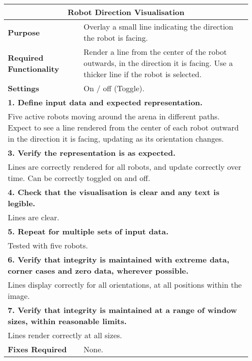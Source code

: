 \begin{longtable}{ l p{10cm} }
 \hline
 \multicolumn{2}{c}{\textbf{Robot Direction Visualisation}}\\
 \hline
 \textbf{Purpose} & Overlay a small line indicating the direction the robot is facing.\\
 \textbf{Required Functionality} & Render a line from the center of the robot outwards, in the direction it is facing. Use a thicker line if the robot is selected.\\
 \textbf{Settings} & On / off (Toggle).\\
 \hline
 \multicolumn{2}{p{14cm}}{\textbf{1. Define input data and expected representation.}}\\
 \multicolumn{2}{p{14cm}}{Five active robots moving around the arena in different paths. Expect to see a line rendered from the center of each robot outward in the direction it is facing, updating as its orientation changes.}\\
 \hline
 \multicolumn{2}{p{14cm}}{\textbf{3. Verify the representation is as expected.}}\\
 \multicolumn{2}{p{14cm}}{Lines are correctly rendered for all robots, and update correctly over time. Can be correctly toggled on and off.}\\
 \hline
 \multicolumn{2}{p{14cm}}{\textbf{4. Check that the visualisation is clear and any text is legible.}}\\
 \multicolumn{2}{p{14cm}}{Lines are clear.}\\
 \hline
 \multicolumn{2}{p{14cm}}{\textbf{5. Repeat for multiple sets of input data.}}\\
 \multicolumn{2}{p{14cm}}{Tested with five robots.}\\
 \hline
 \multicolumn{2}{p{14cm}}{\textbf{6. Verify that integrity is maintained with extreme data, corner cases and zero data, wherever possible.}}\\
 \multicolumn{2}{p{14cm}}{Lines display correctly for all orientations, at all positions within the image.}\\
 \hline
 \multicolumn{2}{p{14cm}}{\textbf{7. Verify that integrity is maintained at a range of window sizes, within reasonable limits.}}\\
 \multicolumn{2}{p{14cm}}{Lines render correctly at all sizes.}\\
 \hline
 \textbf{Fixes Required} & None.\\
 \bottomrule
\end{longtable}
\clearpage

